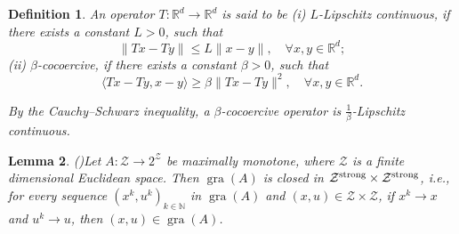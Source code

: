 \documentclass[a4paper,12pt]{article}
\newtheorem{dfn}{Definition}[section]
\newtheorem{lem}[dfn]{Lemma}
\theoremstyle{definition}
\DeclareMathOperator*{\gra}{gra}
\begin{document}
\begin{dfn}
{\rm
An operator  $T: \mathbb{R}^d \rightarrow {\mathbb{R}^d}$ is said to be\vskip 1mm
\noindent
{\rm (i)} $L$-Lipschitz continuous, if there exists a constant $ L > 0$, such that
$$
\|Tx-Ty\|\leq  L\|x-y\|,\quad\forall x, y\in \mathbb{R}^d;
$$\vskip 1mm
\noindent
{\rm (ii)} ${\beta}$-cocoercive, if there exists a constant $ \beta > 0$, such that
$$
\langle Tx-Ty,x-y \rangle \geq  {\beta}\|Tx-Ty\|^2,\quad\forall x, y\in \mathbb{R}^d.
$$\vskip 1mm

By the Cauchy--Schwarz inequality, a ${\beta}$-cocoercive operator is $\frac{1}{\beta}$-Lipschitz continuous.
}
\end{dfn}


\begin{lem}{\rm(\cite[Proposition 20.38]{BC2011})}\label{lem3}
Let $A: \mathcal{Z}\rightarrow 2^{\mathcal{Z}}$ be maximally monotone, where $\mathcal{Z}$ is a finite dimensional Euclidean space. Then $\gra(A)$ is closed in ${\mathcal{Z}}^{\rm strong}\times {\mathcal{Z}}^{\rm strong}$, i.e., for every sequence $(x^{k},u^{k})_{k \in \mathbb{N}}$ in $\gra(A)$ and $(x,u)\in \mathcal{Z}\times \mathcal{Z}$, if $x^{k}\rightarrow x$ and $u^{k}\rightarrow u$, then $(x,u) \in \gra(A)$. \vskip 1mm
\end{lem}

\end{document}
